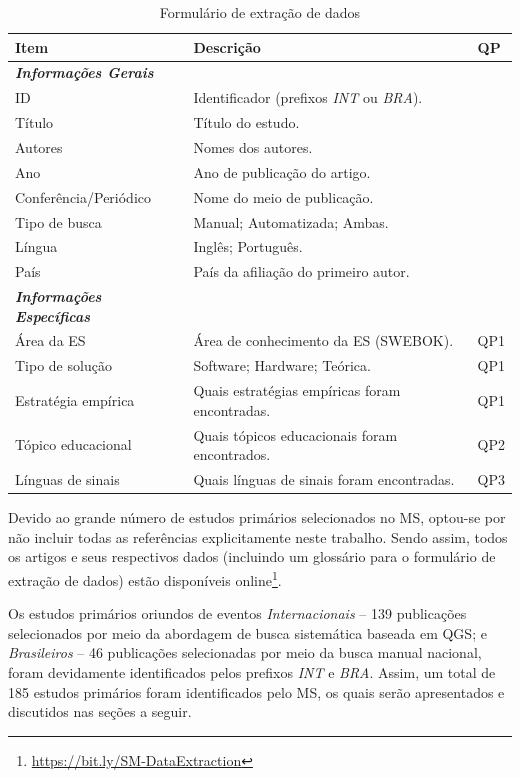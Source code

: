 \begin{table}[htbp]
\centering
\caption{Formulário de extração de dados}
\label{method:table:data-extraction}
\begin{tabular}{lll}
\hline
\textbf{Item} & \textbf{Descrição} & \textbf{QP} \\ \hline
\textit{\textbf{Informações Gerais}} & & \\ \hline
ID & Identificador (prefixos \textit{INT} ou \textit{BRA}). & \\
Título & Título do estudo. & \\
Autores & Nomes dos autores. & \\
Ano & Ano de publicação do artigo. & \\
Conferência/Periódico & Nome do meio de publicação. & \\
Tipo de busca & Manual; Automatizada; Ambas. & \\
Língua & Inglês; Português. & \\
País & País da afiliação do primeiro autor. & \\ \hline
\textit{\textbf{Informações Específicas}} & & \\ \hline
Área da ES & Área de conhecimento da ES (SWEBOK). & QP1 \\
Tipo de solução & Software; Hardware; Teórica. & QP1 \\
Estratégia empírica & Quais estratégias empíricas foram encontradas. & QP1 \\
Tópico educacional & Quais tópicos educacionais foram encontrados. & QP2 \\
Línguas de sinais & Quais línguas de sinais foram encontradas. & QP3 \\ \hline
\end{tabular}
\fautor
\end{table}

Devido ao grande número de estudos primários selecionados no MS, optou-se por não incluir todas as referências explicitamente neste trabalho. Sendo assim, todos os artigos e seus respectivos dados (incluindo um glossário para o formulário de extração de dados) estão disponíveis online\footnote{\url{https://bit.ly/SM-DataExtraction}}.

Os estudos primários oriundos de eventos \textit{Internacionais} -- 139 publicações selecionados por meio da abordagem de busca sistemática baseada em QGS; e \textit{Brasileiros} -- 46 publicações selecionadas por meio da busca manual nacional, foram devidamente identificados pelos prefixos \textit{INT} e \textit{BRA}. Assim, um total de 185 estudos primários foram identificados pelo MS, os quais serão apresentados e discutidos nas seções a seguir.

